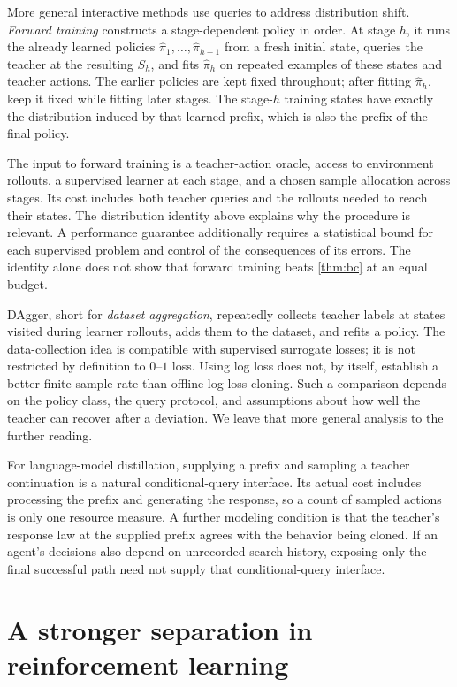 \documentclass[11pt,twoside]{article}
\theoremstyle{definition}
\theoremstyle{remark}
\begin{document}
More general interactive methods use queries to address distribution shift.
\emph{Forward training} constructs a stage-dependent policy in order.
At stage $h$, it runs the already learned policies
$\widehat\pi_1,\ldots,\widehat\pi_{h-1}$ from a fresh initial state, queries
the teacher at the resulting $S_h$, and fits $\widehat\pi_h$ on repeated
examples of these states and teacher actions. The earlier policies are
kept fixed throughout; after fitting $\widehat\pi_h$, keep it fixed while
fitting later stages. The stage-$h$ training states have exactly the distribution
induced by that learned prefix, which is also the prefix of the final policy.

The input to forward training is a teacher-action oracle, access to
environment rollouts, a supervised learner at each stage, and a chosen
sample allocation across stages. Its cost includes both teacher queries and
the rollouts needed to reach their states. The distribution identity above
explains why the procedure is relevant. A performance guarantee additionally
requires a statistical bound for each supervised problem and control of the
consequences of its errors. The identity alone does not show that forward
training beats \cref{thm:bc} at an equal budget.

DAgger, short for \emph{dataset aggregation}, repeatedly collects teacher
labels at states visited during learner rollouts, adds them to the dataset,
and refits a policy. The data-collection idea is compatible with supervised
surrogate losses; it is not restricted by definition to $0$--$1$ loss.
Using log loss does not, by itself, establish a better finite-sample rate
than offline log-loss cloning. Such a comparison depends on the policy
class, the query protocol, and assumptions about how well the teacher can
recover after a deviation. We leave that more general analysis to the
further reading.

For language-model distillation, supplying a prefix and sampling a teacher
continuation is a natural conditional-query interface. Its actual cost
includes processing the prefix and generating the response, so a count of
sampled actions is only one resource measure. A further modeling condition
is that the teacher's response law at the supplied prefix agrees with the
behavior being cloned. If an agent's decisions also depend on unrecorded
search history, exposing only the final successful path need not supply
that conditional-query interface.

\section{A stronger separation in reinforcement learning}
\label{sec:rl}
\end{document}
